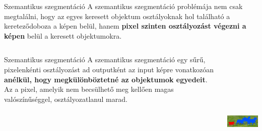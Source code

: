 \documentclass[english, aspectratio=169]{beamer}
\begin{document}
\begin{frame}{Szemantikus szegmentáció}
A szemantikus szegmentáció problémája nem csak megtalálni, hogy az egyes keresett objektum osztályoknak hol található a kereteződoboza a képen belül, hanem \textbf{pixel szinten osztályozást végezni a képen} belül a keresett objektumokra.\par\smallskip
\begin{columns}
\begin{column}{.5\textwidth}
\begin{block}{Szemantikus szegmentáció}
A szemantikus szegmentáció egy sűrű, pixelenkénti osztályozást ad outputként az input képre vonatkozóan \textbf{anélkül, hogy megkülönböztetné az objektumok egyedeit}. Az a pixel, amelyik nem becsülhető meg kellően magas valószínűséggel, osztályozatlanul marad.
\end{block}
\end{column}
\begin{column}{.5\textwidth}
\begin{center}
\includegraphics[height=7cm, width=7cm, keepaspectratio]{images/instance_4.png}
\end{center}
\end{column}
\end{columns}
\end{frame}
\end{document}
